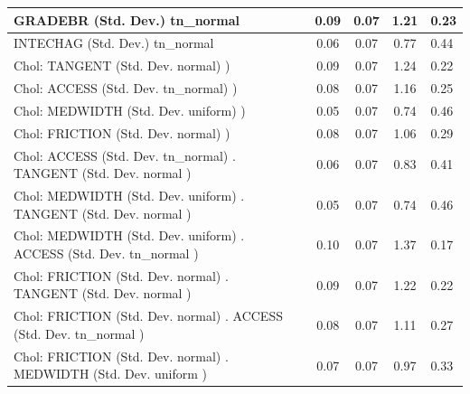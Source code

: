 \begin{table}
\begin{center}
\begin{tabular}{|l|l|c|c|c|l|}
			\hline
			GRADEBR (Std. Dev.) tn_normal &  & 0.09 & 0.07 & 1.21 & 0.23 \\
			\hline
			INTECHAG (Std. Dev.) tn_normal &  & 0.06 & 0.07 & 0.77 & 0.44 \\
			\hline
			 Chol: TANGENT (Std. Dev. normal) ) &  & 0.09 & 0.07 & 1.24 & 0.22 \\
			\hline
			 Chol: ACCESS (Std. Dev. tn_normal) ) &  & 0.08 & 0.07 & 1.16 & 0.25 \\
			\hline
			 Chol: MEDWIDTH (Std. Dev. uniform) ) &  & 0.05 & 0.07 & 0.74 & 0.46 \\
			\hline
			 Chol: FRICTION (Std. Dev. normal) ) &  & 0.08 & 0.07 & 1.06 & 0.29 \\
			\hline
			 Chol: ACCESS (Std. Dev. tn_normal) . TANGENT (Std. Dev.   normal ) &  & 0.06 & 0.07 & 0.83 & 0.41 \\
			\hline
			 Chol: MEDWIDTH (Std. Dev. uniform) . TANGENT (Std. Dev.   normal ) &  & 0.05 & 0.07 & 0.74 & 0.46 \\
			\hline
			 Chol: MEDWIDTH (Std. Dev. uniform) . ACCESS (Std. Dev.   tn_normal ) &  & 0.10 & 0.07 & 1.37 & 0.17 \\
			\hline
			 Chol: FRICTION (Std. Dev. normal) . TANGENT (Std. Dev.   normal ) &  & 0.09 & 0.07 & 1.22 & 0.22 \\
			\hline
			 Chol: FRICTION (Std. Dev. normal) . ACCESS (Std. Dev.   tn_normal ) &  & 0.08 & 0.07 & 1.11 & 0.27 \\
			\hline
			 Chol: FRICTION (Std. Dev. normal) . MEDWIDTH (Std. Dev.   uniform ) &  & 0.07 & 0.07 & 0.97 & 0.33 \\
			\hline
		\end{tabular}
	\end{center}
\end{table}